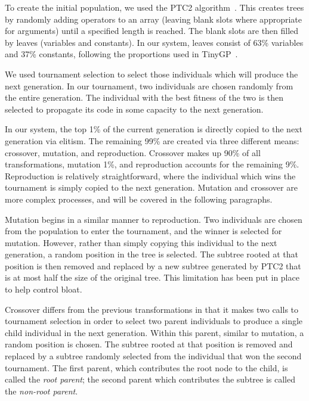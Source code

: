 \documentclass[12pt]{article}
\newcommand{\citep}[1]{\cite{#1}}
\begin{document}
To create the initial population, we used the PTC2 algorithm~\cite{Luke2013Metaheuristics}. This creates trees by randomly adding operators to an array (leaving blank slots where appropriate for arguments) until a specified length is reached. The blank slots are then filled by leaves (variables and constants). In our system, leaves consist of 63\% variables and 37\% constants, following the proportions used in TinyGP~\citep{poli08:fieldguide}.

We used tournament selection to select those individuals which will produce the next generation. In our tournament, two individuals are chosen randomly from the entire generation. The individual with the best fitness of the two is then selected to propagate its code in some capacity to the next generation.

In our system, the top 1\% of the current generation is directly copied to the next generation via elitism. The remaining 99\% are created via three different means: crossover, mutation, and reproduction. Crossover makes up 90\% of all transformations, mutation 1\%, and reproduction accounts for the remaining 9\%. Reproduction is relatively straightforward, where the individual which wins the tournament is simply copied to the next generation. Mutation and crossover are more complex processes, and will be covered in the following paragraphs.

Mutation begins in a similar manner to reproduction. Two individuals are chosen from the population to enter the tournament, and the winner is selected for mutation. However, rather than simply copying this individual to the next generation, a random position in the tree is selected. The subtree rooted at that position is then removed and replaced by a new subtree generated by PTC2 that is at most half the size of the original tree. This limitation has been put in place to help control bloat.

Crossover differs from the previous transformations in that it makes two calls to tournament selection in order to select two parent individuals to produce a single child individual in the next generation. Within this parent, similar to mutation, a random position is chosen. The subtree rooted at that position is removed and replaced by a subtree randomly selected from the individual that won the second tournament. The first parent, which contributes the root node to the child, is called the \emph{root parent}; the second parent which contributes the subtree is called the \emph{non-root parent}.
\end{document}
